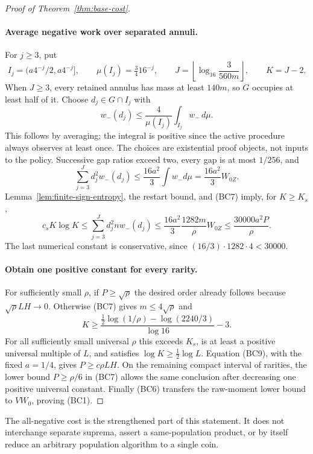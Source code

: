 \documentclass[11pt]{article}
\begin{document}
\begin{proof}[Proof of Theorem~\ref{thm:base-cost}]
\paragraph{Average negative work over separated annuli.}
For $j\ge3$, put
\[
 I_j=(a4^{-j}/2,a4^{-j}],\qquad
 \mu(I_j)=\tfrac34 16^{-j},\qquad
 J=\left\lfloor\log_{16}\frac3{560m}\right\rfloor,
 \qquad K=J-2.
\]
When $J\ge3$, every retained annulus has mass at least $140m$, so
$G$ occupies at least half of it. Choose $d_j\in G\cap I_j$ with
\[
 w_-(d_j)\le\frac4{\mu(I_j)}\int_{I_j}w_-\,d\mu.
\]
This follows by averaging; the integral is positive since the active
procedure always observes at least once. The choices are existential
proof objects, not inputs to the policy. Successive gap ratios exceed
two, every gap is at most $1/256$, and
\[
 \sum_{j=3}^Jd_j^2w_-(d_j)
       \le\frac{16a^2}{3}\int w_-d\mu
       =\frac{16a^2}{3}W_{0Z}.
\]
Lemma~\ref{lem:finite-sign-entropy}, the restart bound, and (BC7) imply,
for $K\ge K_s$,
\[
 c_sK\log K
 \le\sum_{j=3}^Jd_j^2nw_-(d_j)
 \le\frac{16a^2}{3}\frac{1282m}{\rho}W_{0Z}
 \le\frac{30000a^2P}{\rho}.                            \tag{BC9}
\]
The last numerical constant is conservative, since
$(16/3)\cdot1282\cdot4<30000$.

\paragraph{Obtain one positive constant for every rarity.}
For sufficiently small $\rho$, if $P\ge\sqrt\rho$ the desired order
already follows because $\sqrt\rho LH\to0$. Otherwise (BC7) gives
$m\le4\sqrt\rho$ and
\[
 K\ge\frac{\tfrac12\log(1/\rho)-\log(2240/3)}{\log16}-3.
\]
For all sufficiently small universal $\rho$ this exceeds $K_s$, is at
least a positive universal multiple of $L$, and satisfies
$\log K\ge\tfrac12\log L$. Equation (BC9), with the fixed $a=1/4$,
gives $P\ge c\rho LH$. On the remaining compact interval of rarities,
the lower bound $P\ge\rho/6$ in (BC7) allows the same conclusion after
decreasing one positive universal constant. Finally (BC6) transfers the
raw-moment lower bound to $VW_0$, proving (BC1).
\end{proof}

The all-negative cost is the strengthened part of this statement. It
does not interchange separate suprema, assert a same-population product,
or by itself reduce an arbitrary population algorithm to a single coin.

\end{document}
